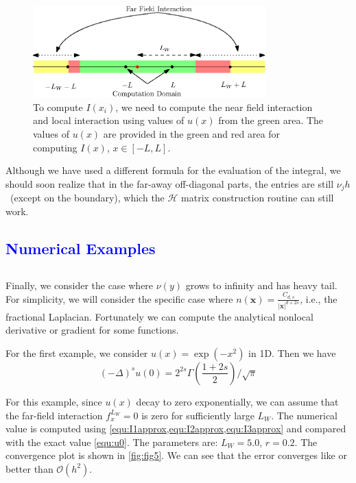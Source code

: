 \documentclass[10pt,a4paper]{article}
\newcommand{\bx}[0]{\mathbf{x}}
\newcommand{\lib}[1]{\subsection*{\textcolor{blue}{#1}}}
\theoremstyle{definition}
\begin{document}
\begin{figure}[H] %
\centering
\includegraphics[width=0.8\textwidth,keepaspectratio]{figures/fig31}
\caption{To compute $I(x_i)$, we need to compute the near field interaction and local interaction using values of $u(x)$ from the green area. The values of $u(x)$ are provided in the green and red area for computing $I(x)$, $x\in [-L, L]$.}
\label{fig:fig31}
\end{figure}


Although we have used a different formula for the evaluation of the integral, we should soon realize that in the far-away off-diagonal parts, the entries are still $\nu_j h$~(except on the boundary), which the $\mathcal{H}$ matrix construction routine can still work. 


\lib{Numerical Examples}

\subsection{}

Finally, we consider the case where $\nu(y)$ grows to infinity and has heavy tail. For simplicity, we will consider the specific case where $n(\bx) = \frac{C_{d, s}}{|\bx|^{d+2s}}$, i.e., the fractional Laplacian. Fortunately we can compute  the analytical nonlocal derivative or gradient for some functions. 

For the first example, we consider $u(x)=\exp(-x^2)$ in 1D. Then we have
\begin{equation}\label{equ:u0}
	(-\Delta)^s u(0) = 2^{2s}\Gamma\left( \frac{1+2s}{2} \right)/\sqrt{\pi}
\end{equation}

For this example, since $u(x)$ decay to zero exponentially, we can assume that the far-field interaction $f^{L_W}_x=0$ is zero for sufficiently large $L_W$. The numerical value is computed using \cref{equ:I1approx,equ:I2approx,equ:I3approx} and compared with the exact value \cref{equ:u0}. The parameters are: $L_W=5.0$, $r=0.2$. The convergence plot is shown in \cref{fig:fig5}. We can see that the error converges like or better than $\mathcal{O}(h^2)$. 
\end{document}
